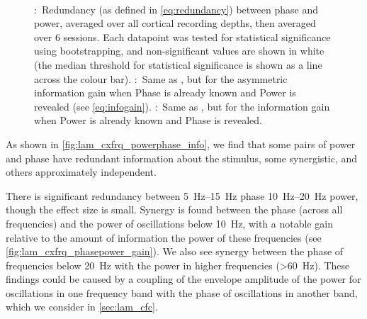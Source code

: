 \begin{figure}[htbp]
    \centering
    \\
    \hspace*{\fill}
    \hspace*{\fill}\hspace{.2cm}\hspace*{\fill}
    \hspace*{\fill}
    \caption{
\protect{}:~Redundancy (as defined in \autoref{eq:redundancy}) between phase and power, averaged over all cortical recording depths, then averaged over \num{6} sessions.
Each datapoint was tested for statistical significance using bootstrapping, and non-significant values are shown in white (the median threshold for statistical significance is shown as a line across the colour bar).
\protect{}:~Same as \protect{}, but for the asymmetric information gain when Phase is already known and Power is revealed (see \autoref{eq:infogain}).
\protect{}:~Same as \protect{}, but for the information gain when Power is already known and Phase is revealed.
}
\label{fig:lam_cxfrq_powerphase_info}
\end{figure}

As shown in \autoref{fig:lam_cxfrq_powerphase_info}, we find that some pairs of power and phase have redundant information about the stimulus, some synergistic, and others approximately independent.

There is significant redundancy between \SIrange{5}{15}{Hz} phase \SIrange{10}{20}{Hz} power, though the effect size is small.
Synergy is found between the phase (across all frequencies) and the power of oscillations below \SI{10}{Hz}, with a notable gain relative to the amount of information the power of these frequencies (see \autoref{fig:lam_cxfrq_phasepower_gain}).
We also see synergy between the phase of frequencies below \SI{20}{Hz} with the power in higher frequencies (\SI{>60}{Hz}).
These findings could be caused by a coupling of the envelope amplitude of the power for oscillations in one frequency band with the phase of oscillations in another band, which we consider in \autoref{sec:lam_cfc}.

